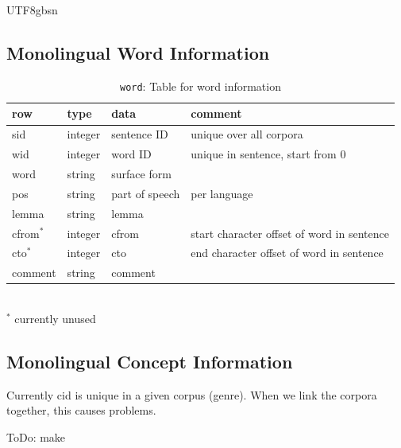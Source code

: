 \documentclass[12pt]{book} %
\begin{document}
\begin{CJK}{UTF8}{gbsn}
\subsection{Monolingual Word Information}

\begin{table}[htpb]
  \centering\caption{\texttt{sent}: Table for original sentence}
\bigskip
  \begin{tabular}{llll}
  \textbf{row}   &  \textbf{type} & \textbf{data} & \textbf{comment} \\\hline
  sid   & integer & sentence ID & unique over all corpora\\
  wid   & integer & word ID & unique in sentence, start from 0\\
  word  & string  & surface form &  \\
  pos   & string  & part of speech & per language  \\
  lemma & string  & lemma \\
  cfrom$^*$ & integer & cfrom & start character offset of word in sentence \\
  cto$^*$ & integer & cto & end character offset of word in sentence \\
  comment & string & comment \\
\hline
\end{tabular}
\\ $^*$ currently unused
\caption{\texttt{word}: Table for word information}
\end{table}

\subsection{Monolingual Concept Information}

Currently cid is unique in a given corpus (genre).  When we link the
corpora together, this causes problems.

ToDo: make 


\end{CJK}
\end{document}
